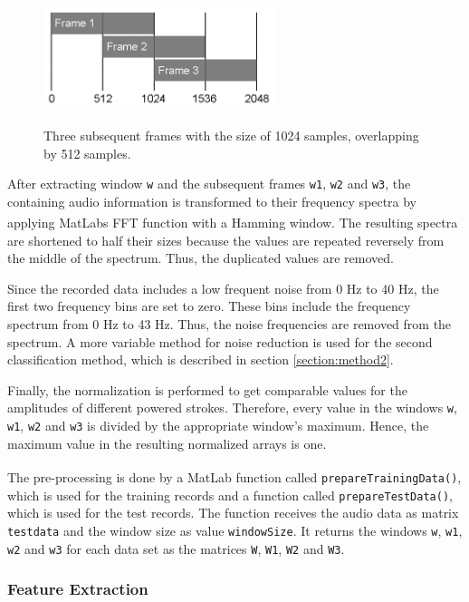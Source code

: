 \begin{figure}[htb]
	\centering
	\includegraphics[height=3cm]{images/frames.png}
	\label{}
	\caption{Three subsequent frames with the size of 1024 samples, overlapping by 512 samples.}
	\label{fig:frames}
\end{figure}

After extracting window \lstinline{w} and the subsequent frames \lstinline{w1}, \lstinline{w2} and \lstinline{w3}, the containing audio information is transformed to their frequency spectra by applying MatLab\textsuperscript{\textregistered}s FFT function with a Hamming window. The resulting spectra are shortened to half their sizes because the values are repeated reversely from the middle of the spectrum. Thus, the duplicated values are removed.

Since the recorded data includes a low frequent noise from 0 Hz to 40 Hz, the first two frequency bins are set to zero. These bins include the frequency spectrum from 0 Hz to 43 Hz. Thus, the noise frequencies are removed from the spectrum. A more variable method for noise reduction is used for the second classification method, which is described in section \ref{section:method2}.

Finally, the normalization is performed to get comparable values for the amplitudes of different powered strokes. Therefore, every value in the windows \lstinline{w}, \lstinline{w1}, \lstinline{w2} and \lstinline{w3} is divided by the appropriate window's maximum. Hence, the maximum value in the resulting normalized arrays is one.

The pre-processing is done by a MatLab\textsuperscript{\textregistered} function called \lstinline{prepareTrainingData()}, which is used for the training records and a function called \lstinline{prepareTestData()}, which is used for the test records. The function receives the audio data as matrix \lstinline{testdata} and the window size as value \lstinline{windowSize}. It returns the windows \lstinline{w}, \lstinline{w1}, \lstinline{w2} and \lstinline{w3} for each data set as the matrices \lstinline{W}, \lstinline{W1}, \lstinline{W2} and \lstinline{W3}.

\subsubsection{Feature Extraction}
\label{section:method1Features}

